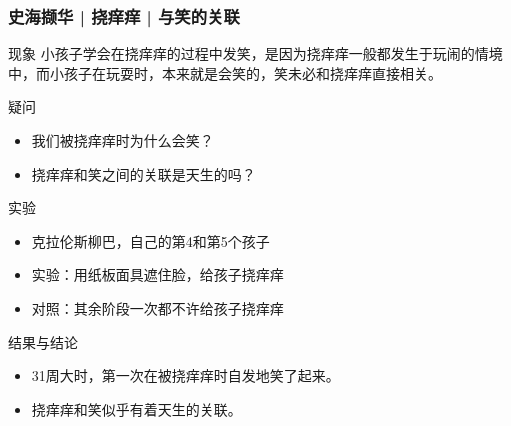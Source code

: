 \begin{frame}
  \frametitle{史海撷华 | 挠痒痒 | 与笑的关联}
  \begin{block}{现象}
小孩子学会在挠痒痒的过程中发笑，是因为挠痒痒一般都发生于玩闹的情境中，而小孩子在玩耍时，本来就是会笑的，笑未必和挠痒痒直接相关。
  \end{block}
  \pause
  \begin{block}{疑问}
    \begin{itemize}
      \item 我们被挠痒痒时为什么会笑？
      \item 挠痒痒和笑之间的关联是天生的吗？
    \end{itemize}
  \end{block}
  \pause
  \begin{block}{实验}
    \begin{itemize}
      \item 克拉伦斯\textbullet 柳巴，自己的第4和第5个孩子
      \item 实验：用纸板面具遮住脸，给孩子挠痒痒
      \item 对照：其余阶段一次都不许给孩子挠痒痒
    \end{itemize}
  \end{block}
  \pause
  \begin{block}{结果与结论}
    \begin{itemize}
      \item 31周大时，第一次在被挠痒痒时自发地笑了起来。
      \item 挠痒痒和笑似乎有着天生的关联。
    \end{itemize}
  \end{block}
\end{frame}

